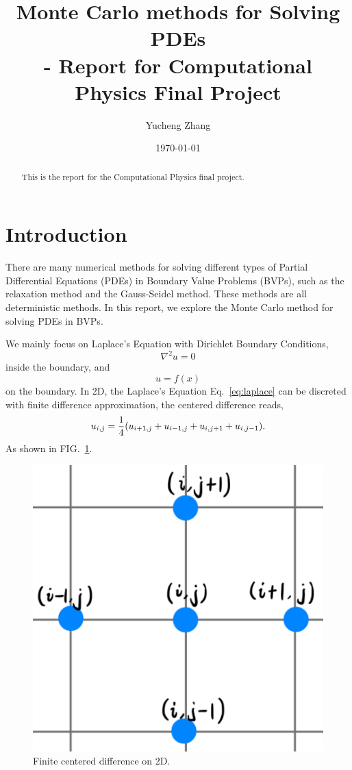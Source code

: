 \documentclass[aps, prl, reprint, groupedaddress]{revtex4-1}
\begin{document}
    
\title{Monte Carlo methods for Solving PDEs\\- Report for Computational Physics Final Project}
\author{Yucheng Zhang}
\date{\today}
    
\begin{abstract}
    This is the report for the Computational Physics final project.
\end{abstract}
    
\maketitle

\section{Introduction}

There are many numerical methods for solving different types of Partial Differential Equations (PDEs) in Boundary Value Problems (BVPs), such as the relaxation method and the Gauss-Seidel method. These methods are all deterministic methods. In this report, we explore the Monte Carlo method for solving PDEs in BVPs. 

We mainly focus on Laplace's Equation with Dirichlet Boundary Conditions,
\begin{equation}
    \nabla^2 u = 0
    \label{eq:laplace}
\end{equation} inside the boundary, and
\begin{equation}
    u = f(x)
\end{equation} on the boundary. In 2D, the Laplace's Equation Eq.~\ref{eq:laplace} can be discreted with finite difference approximation, the centered difference reads,
\begin{equation}
    u_{i,j} = \frac{1}{4} \qty(u_{i+1,j}+u_{i-1,j}+u_{i,j+1}+u_{i,j-1}).
\end{equation}
As shown in FIG.~\ref{fig:disc}.

\begin{figure}[htbp]
    \centering
    \includegraphics[width=.4\textwidth]{./figs/disc}
    \caption{\label{fig:disc} Finite centered difference on 2D.}
\end{figure}
\end{document}
